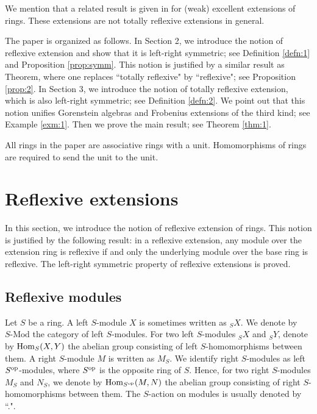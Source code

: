 \documentclass[a4paper]{amsart}
\theoremstyle{definition}
\theoremstyle{remark}
\numberwithin{equation}{section}
\begin{document}
\vskip 5pt

We mention that a related result is given in \cite{HS} for (weak) excellent extensions of rings. These extensions are not
totally reflexive extensions in general.

The paper is organized as follows. In Section 2, we introduce the notion of reflexive extension  and show that it is left-right symmetric; see Definition \ref{defn:1} and Proposition \ref{prop:symm}.  This notion is justified by a similar result as Theorem, where one replaces ``totally reflexive" by ``reflexive"; see Proposition \ref{prop:2}. In Section 3, we introduce the notion of totally reflexive extension, which is also left-right symmetric; see Definition \ref{defn:2}.  We point out that this notion unifies Gorenstein algebras and Frobenius extensions of the third kind; see Example \ref{exm:1}. Then we prove the main result; see Theorem \ref{thm:1}.

All rings in the paper are associative rings with a unit. Homomorphisms of rings are required to send the unit to the unit.

\section{Reflexive extensions}

In this section, we introduce the notion of reflexive extension of rings. This notion is justified by
the following result: in a reflexive extension, any module over the extension ring is reflexive if and
only the underlying module over the base ring is reflexive. The left-right symmetric property
of reflexive extensions is proved.

\subsection{Reflexive modules} Let $S$ be a ring. A left $S$-module $X$ is sometimes written as $_SX$.  We denote
by $S\mbox{-Mod}$ the category of left $S$-modules. For two
left $S$-modules $_SX$ and $_SY$, denote by ${\rm Hom}_S(X, Y)$ the abelian group consisting of
left $S$-homomorphisms between them. A right $S$-module $M$ is written as $M_S$. We identify right
$S$-modules as left $S^{\rm op}$-modules, where $S^{\rm op}$ is the opposite ring of $S$.
Hence, for two right $S$-modules $M_S$ and $N_S$, we denote by ${\rm Hom}_{S^{\rm op}}(M, N)$
the abelian group consisting of right $S$-homomorphisms between them. The $S$-action on modules is usually denoted by
``.".
\end{document}
